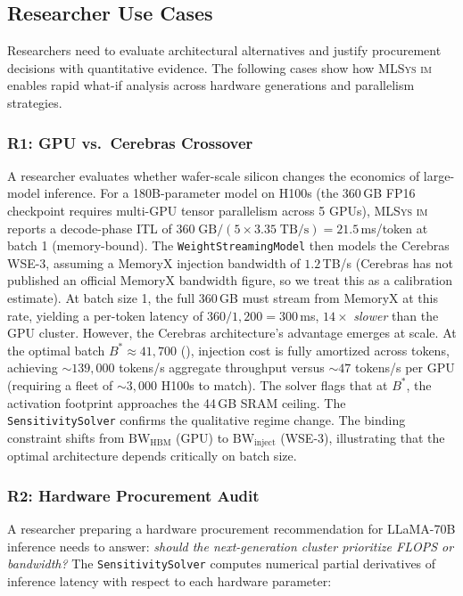 \documentclass[10pt,twocolumn]{article}
\newcommand{\mlsysim}{\mbox{\textsc{MLSys}\,\textperiodcentered\,\textsc{im}}\xspace}
\begin{document}
\subsection{Researcher Use Cases}

Researchers need to evaluate architectural alternatives and justify procurement decisions with quantitative evidence. The following cases show how \mlsysim enables rapid what-if analysis across hardware generations and parallelism strategies.

\subsubsection{R1: GPU vs.\ Cerebras Crossover}
A researcher evaluates whether wafer-scale silicon changes the economics of large-model inference. For a 180B-parameter model on H100s (the 360\,GB FP16 checkpoint requires multi-GPU tensor parallelism across 5 GPUs), \mlsysim reports a decode-phase ITL of $360\;\text{GB} / (5 \times 3.35\;\text{TB/s}) = 21.5$\,ms/token at batch 1 (memory-bound). The \texttt{WeightStreamingModel} then models the Cerebras WSE-3, assuming a MemoryX injection bandwidth of $1.2$\,TB/s (Cerebras has not published an official MemoryX bandwidth figure, so we treat this as a calibration estimate). At batch size 1, the full 360\,GB must stream from MemoryX at this rate, yielding a per-token latency of $360 / 1{,}200 = 300$\,ms, $14{\times}$ \emph{slower} than the GPU cluster. However, the Cerebras architecture's advantage emerges at scale. At the optimal batch $B^{*} \approx 41{,}700$ (), injection cost is fully amortized across tokens, achieving ${\sim}139{,}000$ tokens/s aggregate throughput versus ${\sim}47$ tokens/s per GPU (requiring a fleet of ${\sim}3{,}000$ H100s to match). The solver flags that at $B^{*}$, the activation footprint approaches the 44\,GB SRAM ceiling. The \texttt{SensitivitySolver} confirms the qualitative regime change. The binding constraint shifts from $\text{BW}_{\text{HBM}}$ (GPU) to $\text{BW}_{\text{inject}}$ (WSE-3), illustrating that the optimal architecture depends critically on batch size.

\subsubsection{R2: Hardware Procurement Audit}
A researcher preparing a hardware procurement recommendation for LLaMA-70B inference needs to answer: \emph{should the next-generation cluster prioritize FLOPS or bandwidth?} The \texttt{SensitivitySolver} computes numerical partial derivatives of inference latency with respect to each hardware parameter:
\end{document}
